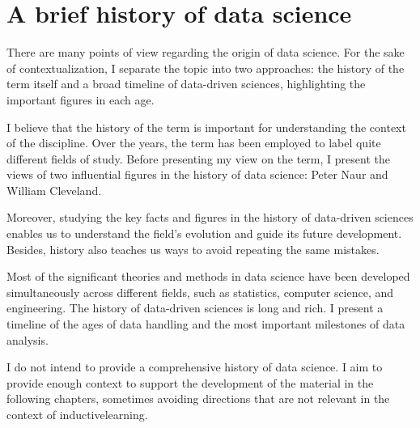 \chapter{A brief history of data science}
\label{chap:history}
\glsresetall


There are many points of view regarding the origin of data science.  For the sake of
contextualization, I separate the topic into two approaches: the history of the term itself
and a broad timeline of data-driven sciences, highlighting the important figures in each
age.

I believe that the history of the term is important for understanding the context of the
discipline. Over the years, the term has been employed to label quite different fields of
study.  Before presenting my view on the term, I present the views of two influential
figures in the history of data science: Peter Naur and William Cleveland.

Moreover, studying the key facts and figures in the history of data-driven sciences
enables us to understand the field's evolution and guide its future development.  Besides, history also teaches us ways to avoid repeating the same mistakes.

Most of the significant theories and methods in data science have been developed
simultaneously across different fields, such as statistics, computer science, and engineering.
The history of data-driven sciences is long and rich. I present a timeline of the ages of
data handling and the most important milestones of data analysis.

I do not intend to provide a comprehensive history of data science.  I aim to provide
enough context to support the development of the material in the following chapters,
sometimes avoiding directions that are not relevant in the context of \gls{inductivelearning}.

